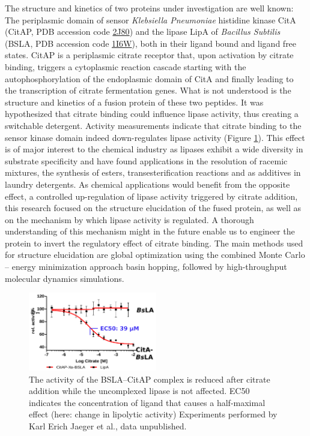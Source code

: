 \documentclass[english, a4paper, 12pt, titlepage, draft]{article}
\newcommand{\PDB}[1]{\href{http://pdb.rcsb.org/pdb/explore/explore.do?structureId=#1}{#1}}
\begin{document}
The structure and kinetics of two proteins under investigation are well known:
The periplasmic domain of sensor \textit{Klebsiella Pneumoniae} histidine kinase CitA (CitAP, PDB accession code \PDB{2J80}) \cite{CitA_2J80}
and the lipase LipA of \textit{Bacillus Subtilis} (BSLA, PDB accession code \PDB{1I6W}), \cite{BSLA_1I6W} both in their ligand bound and ligand free states.
CitAP is a periplasmic citrate receptor that, upon activation by citrate binding, triggers a cytoplasmic reaction cascade starting with the autophosphorylation of the endoplasmic domain of CitA and finally leading to the transcription of citrate fermentation genes.
What is not understood is the structure and kinetics of a fusion protein of these two peptides.
It was hypothesized that citrate binding could influence lipase activity, thus creating a switchable detergent.
Activity measurements indicate that citrate binding to the sensor kinase domain indeed down-regulates lipase activity (Figure \ref{fig:BSLAactivity}).
This effect is of major interest to the chemical industry as lipases exhibit a wide diversity in substrate specificity and have found applications in the resolution of racemic mixtures, the synthesis of esters, transesterification reactions and as additives in laundry detergents.
As chemical applications would benefit from the opposite effect, a controlled up-regulation of lipase activity triggered by citrate addition, this research focused on the structure elucidation of the fused protein, as well as on the mechanism by which lipase activity is regulated.
A thorough understanding of this mechanism might in the future enable us to engineer the protein to invert the regulatory effect of citrate binding.
The main methods used for structure elucidation are global optimization using the combined Monte Carlo -- energy minimization approach basin hopping, followed by high-throughput molecular dynamics simulations. 
 

\begin{figure}
    \centering
    \includegraphics[width=0.5\textwidth]{figures/BSLA_activity/BSLA_activity.png}
    \caption{The activity of the BSLA--CitAP complex is reduced after citrate addition while the uncomplexed lipase is not affected.
    EC50 indicates the concentration of ligand that causes a half-maximal effect (here: change in lipolytic activity)
    Experiments performed by Karl Erich Jaeger et al., data unpublished.}   
    \label{fig:BSLAactivity}
\end{figure}
\end{document}
